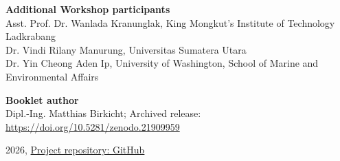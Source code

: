 {\begin{titlepage}
\vspace{5mm}

{\large

\textbf{Additional Workshop participants}\\[2mm]

Asst. Prof. Dr. Wanlada Kranunglak, King Mongkut's Institute of Technology Ladkrabang\\
Dr. Vindi Rilany Manurung, Universitas Sumatera Utara\\
Dr. Yin Cheong Aden Ip, University of Washington, School of Marine and Environmental Affairs\\
\par}

\vspace{8mm}

{\large
\textbf{Booklet author}\\[2mm]
Dipl.-Ing. Matthias Birkicht; Archived release: \href{https://doi.org/10.5281/zenodo.21909959}
{https://doi.org/10.5281/zenodo.21909959}
\par}


{\normalsize
2026, \href{https://github.com/matthiasbirkich/diy-quantifluorone-dsdna-fluorometer}
{Project repository: GitHub}
\par}

\end{titlepage}
}